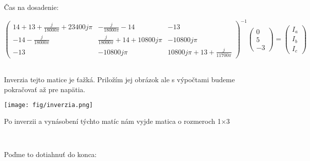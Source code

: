 \centerline{Čas na dosadenie:}
\centering
\[
\begin{pmatrix}
    14+13+\frac{j}{\num{18000}\pi}+\num{23400}j\pi &-\frac{j}{\num{18000}\pi}-14 &-13\\
    -14-\frac{j}{\num{18000}\pi} &\frac{j}{\num{18000}\pi}+14+\num{10800}j\pi&-\num{10800}j\pi\\
    -13 &-\num{10800}j\pi &\num{10800}j\pi+13+\frac{j}{\num{11700}\pi}
    
\end{pmatrix}^{-1}
\begin{pmatrix}
    0\\
    5\\
    -3
\end{pmatrix}
=
\begin{pmatrix}
    I_a\\
    I_b\\
    I_c
\end{pmatrix}
\]\\
\bigskip
\newpage
\centerline{Inverzia tejto matice je ťažká. Priložím jej obrázok ale s výpočtami budeme pokračovať až pre napätia.}
\centering
\texttt{[image: fig/inverzia.png]}
\\
\bigskip
\centerline{Po inverzii a vynásobení týchto matíc nám vyjde matica o rozmeroch 1$\times$3}
\bigskip
\centering
{}
\scalebox{1.5}{$I_c = -0.019 + 0.1077j A$}
\\
\bigskip
\centerline{Poďme to dotiahnuť do konca:}
\bigskip
\centering
{}
\\
\bigskip
\centering
{}


